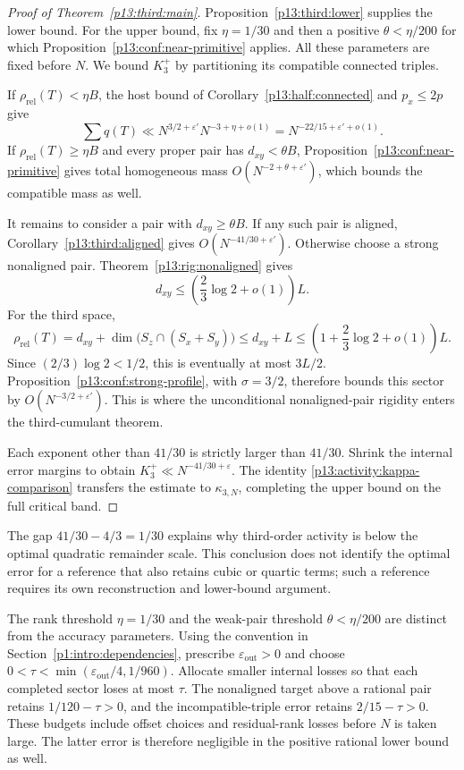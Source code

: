 \begin{proof}[Proof of Theorem~\ref{p13:third:main}]
Proposition~\ref{p13:third:lower} supplies the lower bound.
For the upper bound, fix $\eta=1/30$ and then a positive
$\theta<\eta/200$ for which
Proposition~\ref{p13:conf:near-primitive} applies.
All these parameters are fixed before $N$.
We bound $K_3^+$ by partitioning its compatible connected triples.

If $\rho_{\mathrm{rel}}(T)<\eta B$, the host bound of
Corollary~\ref{p13:half:connected} and $p_x\leq2p$ give
\[
 \sum q(T)\ll
        N^{3/2+\varepsilon'}N^{-3+\eta+o(1)}
       =N^{-22/15+\varepsilon'+o(1)}.
\]
If $\rho_{\mathrm{rel}}(T)\geq\eta B$ and every proper pair has
$d_{xy}<\theta B$, Proposition~\ref{p13:conf:near-primitive}
gives total homogeneous mass $O(N^{-2+\theta+\varepsilon'})$,
which bounds the compatible mass as well.

It remains to consider a pair with $d_{xy}\geq\theta B$.
If any such pair is aligned, Corollary~\ref{p13:third:aligned}
gives $O(N^{-41/30+\varepsilon'})$.
Otherwise choose a strong nonaligned pair.  Theorem~\ref{p13:rig:nonaligned}
gives
\[
 d_{xy}\leq\left(\frac23\log2+o(1)\right)L.
\]
For the third space,
\[
 \rho_{\mathrm{rel}}(T)
   =d_{xy}+\dim\bigl(S_z\cap(S_x+S_y)\bigr)
   \leq d_{xy}+L
   \leq\left(1+\frac23\log2+o(1)\right)L.
\]
Since $(2/3)\log2<1/2$, this is eventually at most $3L/2$.
Proposition~\ref{p13:conf:strong-profile}, with $\sigma=3/2$,
therefore bounds this sector by $O(N^{-3/2+\varepsilon'})$.
This is where the unconditional nonaligned-pair rigidity enters the
third-cumulant theorem.

Each exponent other than $41/30$ is strictly larger than $41/30$.
Shrink the internal error margins to obtain
$K_3^+\ll N^{-41/30+\varepsilon}$.
The identity \eqref{p13:activity:kappa-comparison} transfers the estimate to
$\kappa_{3,N}$, completing the upper bound on the full critical band.
\end{proof}

The gap $41/30-4/3=1/30$ explains why third-order activity is below
the optimal quadratic remainder scale.  This conclusion does not
identify the optimal error for a reference that also retains cubic or
quartic terms; such a reference requires its own reconstruction and
lower-bound argument.

The rank threshold $\eta=1/30$ and the weak-pair threshold
$\theta<\eta/200$ are distinct from the accuracy parameters.
Using the convention in Section~\ref{p1:intro:dependencies}, prescribe
$\varepsilon_{\mathrm{out}}>0$ and choose
$0<\tau<\min(\varepsilon_{\mathrm{out}}/4,1/960)$.
Allocate smaller internal losses so that each completed sector loses
at most $\tau$. The nonaligned target above a rational pair retains
$1/120-\tau>0$, and the incompatible-triple error retains
$2/15-\tau>0$. These budgets include offset choices and residual-rank
losses before $N$ is taken large. The latter error is therefore
negligible in the positive rational lower bound as well.

